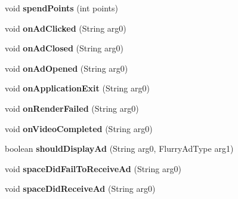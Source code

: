 \begin{DoxyCompactItemize}
\mbox{\label{classorg_1_1cocos2dx_1_1plugin_1_1AdsFlurry_a202aaf4820c2712f31cdb5c38449f8d9}} 
void {\bfseries spend\+Points} (int points)
\item 
\mbox{\label{classorg_1_1cocos2dx_1_1plugin_1_1AdsFlurry_afbb834df51e0e69f7c8ebce328249939}} 
void {\bfseries on\+Ad\+Clicked} (String arg0)
\item 
\mbox{\label{classorg_1_1cocos2dx_1_1plugin_1_1AdsFlurry_a16eabc2c741cc2c339904d46cdb0b39e}} 
void {\bfseries on\+Ad\+Closed} (String arg0)
\item 
\mbox{\label{classorg_1_1cocos2dx_1_1plugin_1_1AdsFlurry_a99f9024ca357f5e51ecf07da48a43ba8}} 
void {\bfseries on\+Ad\+Opened} (String arg0)
\item 
\mbox{\label{classorg_1_1cocos2dx_1_1plugin_1_1AdsFlurry_a426d1c96078841871546300e0fa38a38}} 
void {\bfseries on\+Application\+Exit} (String arg0)
\item 
\mbox{\label{classorg_1_1cocos2dx_1_1plugin_1_1AdsFlurry_a027cb1c58d1a0e2457061b17a722e7c8}} 
void {\bfseries on\+Render\+Failed} (String arg0)
\item 
\mbox{\label{classorg_1_1cocos2dx_1_1plugin_1_1AdsFlurry_a4595f5885fc5f7f8342034d966db547c}} 
void {\bfseries on\+Video\+Completed} (String arg0)
\item 
\mbox{\label{classorg_1_1cocos2dx_1_1plugin_1_1AdsFlurry_afecb017cc1e23f4aa1bfac8121e8ff44}} 
boolean {\bfseries should\+Display\+Ad} (String arg0, Flurry\+Ad\+Type arg1)
\item 
\mbox{\label{classorg_1_1cocos2dx_1_1plugin_1_1AdsFlurry_ad37d64a996d8232968bad4c9b316637b}} 
void {\bfseries space\+Did\+Fail\+To\+Receive\+Ad} (String arg0)
\item 
\mbox{\label{classorg_1_1cocos2dx_1_1plugin_1_1AdsFlurry_ad0aece7180adfaec920acaff62ac8f18}} 
void {\bfseries space\+Did\+Receive\+Ad} (String arg0)
\end{DoxyCompactItemize}
